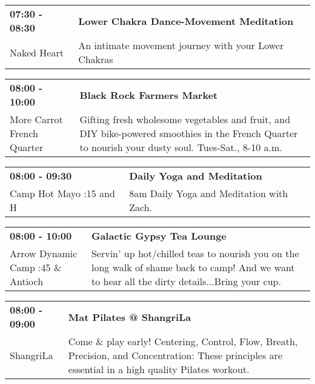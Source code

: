 \begin{tabular}{ p{1in} p{2.2in} }
    \textbf{07:30 - 08:30} & \textbf{Lower Chakra Dance-Movement Meditation} \\
    Naked Heart \newline  & An intimate movement journey with your Lower Chakras \\
    \hline 
\end{tabular}
    
\begin{tabular}{ p{1in} p{2.2in} }
    \textbf{08:00 - 10:00} & \textbf{Black Rock Farmers Market} \\
    More Carrot \newline French Quarter & Gifting fresh wholesome vegetables and fruit, and DIY bike-powered smoothies in the French Quarter to nourish your dusty soul. Tues-Sat., 8-10 a.m. \\
    \hline 
\end{tabular}
    
\begin{tabular}{ p{1in} p{2.2in} }
    \textbf{08:00 - 09:30} & \textbf{Daily Yoga and Meditation} \\
    Camp Hot Mayo \newline 9:15 and H & 8am Daily Yoga and Meditation with Zach. \\
    \hline 
\end{tabular}
    
\begin{tabular}{ p{1in} p{2.2in} }
    \textbf{08:00 - 10:00} & \textbf{Galactic Gypsy Tea Lounge} \\
    Arrow Dynamic Camp \newline 9:45 \& Antioch & Servin' up hot/chilled teas to nourish you on the long walk of shame back to camp! And we want to hear all the dirty details...Bring your cup. \\
    \hline 
\end{tabular}
    
\begin{tabular}{ p{1in} p{2.2in} }
    \textbf{08:00 - 09:00} & \textbf{Mat Pilates @ ShangriLa} \\
    ShangriLa \newline  & Come \& play early! Centering, Control, Flow, Breath, Precision, and Concentration: These principles are essential in a high quality Pilates workout. \\
    \hline 
\end{tabular}
    
